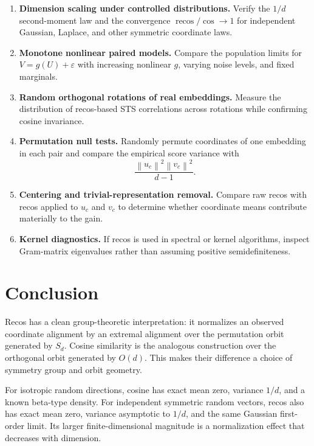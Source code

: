 \documentclass[11pt,a4paper]{article}
\newcommand{\norm}[1]{\left\lVert #1\right\rVert}
\newcommand{\recos}{\operatorname{recos}}
\newcommand{\cosim}{\operatorname{cos}}
\begin{document}
\begin{enumerate}[leftmargin=2em]
    \item \textbf{Dimension scaling under controlled distributions.} Verify the $1/d$ second-moment law and the convergence $\recos/\cosim\to1$ for independent Gaussian, Laplace, and other symmetric coordinate laws.

    \item \textbf{Monotone nonlinear paired models.} Compare the population limits for $V=g(U)+\varepsilon$ with increasing nonlinear $g$, varying noise levels, and fixed marginals.

    \item \textbf{Random orthogonal rotations of real embeddings.} Measure the distribution of recos-based STS correlations across rotations while confirming cosine invariance.

    \item \textbf{Permutation null tests.} Randomly permute coordinates of one embedding in each pair and compare the empirical score variance with
    \begin{equation}
        \frac{\norm{u_c}^2\norm{v_c}^2}{d-1}.
    \end{equation}

    \item \textbf{Centering and trivial-representation removal.} Compare raw recos with recos applied to $u_c$ and $v_c$ to determine whether coordinate means contribute materially to the gain.

    \item \textbf{Kernel diagnostics.} If recos is used in spectral or kernel algorithms, inspect Gram-matrix eigenvalues rather than assuming positive semidefiniteness.
\end{enumerate}

\section{Conclusion}

Recos has a clean group-theoretic interpretation: it normalizes an observed coordinate alignment by an extremal alignment over the permutation orbit generated by $S_d$. Cosine similarity is the analogous construction over the orthogonal orbit generated by $O(d)$. This makes their difference a choice of symmetry group and orbit geometry.

For isotropic random directions, cosine has exact mean zero, variance $1/d$, and a known beta-type density. For independent symmetric random vectors, recos also has exact mean zero, variance asymptotic to $1/d$, and the same Gaussian first-order limit. Its larger finite-dimensional magnitude is a normalization effect that decreases with dimension.
\end{document}
